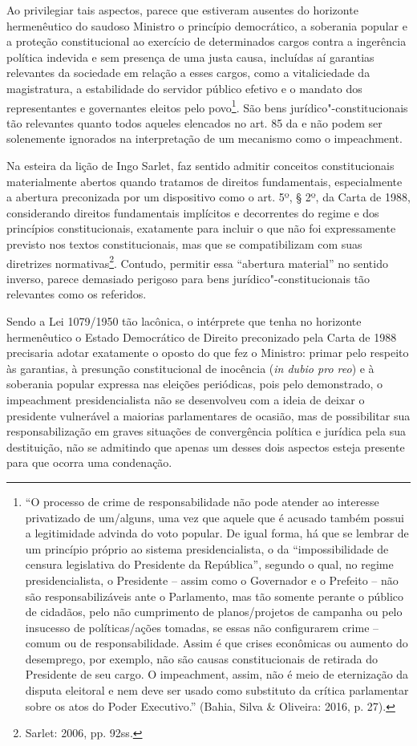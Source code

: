 Ao privilegiar tais aspectos, parece que estiveram ausentes do horizonte
hermenêutico do saudoso Ministro o princípio democrático, a soberania
popular e a proteção constitucional ao exercício de determinados cargos
contra a ingerência política indevida e sem presença de uma justa causa,
incluídas aí garantias relevantes da sociedade em relação a esses
cargos, como a vitaliciedade da magistratura, a estabilidade do servidor
público efetivo e o mandato dos representantes e governantes eleitos
pelo povo\footnote{``O processo de crime de responsabilidade não pode
  atender ao interesse privatizado de um/alguns, uma vez que aquele que
  é acusado também possui a legitimidade advinda do voto popular. De
  igual forma, há que se lembrar de um princípio próprio ao sistema
  presidencialista, o da ``impossibilidade de censura legislativa do
  Presidente da República'', segundo o qual, no regime presidencialista,
  o Presidente -- assim como o Governador e o Prefeito -- não são
  responsabilizáveis ante o Parlamento, mas tão somente perante o
  público de cidadãos, pelo não cumprimento de planos/projetos de
  campanha ou pelo insucesso de políticas/ações tomadas, se essas não
  configurarem crime -- comum ou de responsabilidade. Assim é que crises
  econômicas ou aumento do desemprego, por exemplo, não são causas
  constitucionais de retirada do Presidente de seu cargo. O
  impeachment, assim, não é meio de eternização da disputa
  eleitoral e nem deve ser usado como substituto da crítica parlamentar
  sobre os atos do Poder Executivo.'' (Bahia, Silva \& Oliveira: 2016,
  p. 27).}. São bens jurídico"-constitucionais tão relevantes quanto todos
aqueles elencados no art. 85 da  e não podem ser solenemente ignorados
na interpretação de um mecanismo como o impeachment.

Na esteira da lição de Ingo Sarlet, faz sentido admitir conceitos
constitucionais materialmente abertos quando tratamos de direitos
fundamentais, especialmente a abertura preconizada por um dispositivo
como o art. 5º, § 2º, da Carta de 1988, considerando direitos
fundamentais implícitos e decorrentes do regime e dos princípios
constitucionais, exatamente para incluir o que não foi expressamente
previsto nos textos constitucionais, mas que se compatibilizam com suas
diretrizes normativas\footnote{Sarlet: 2006, pp. 92ss.}. Contudo, permitir essa
``abertura material'' no sentido inverso, parece demasiado perigoso para
bens jurídico"-constitucionais tão relevantes como os referidos.

Sendo a Lei 1079/1950 tão lacônica, o intérprete que tenha no horizonte
hermenêutico o Estado Democrático de Direito preconizado pela Carta de
1988 precisaria adotar exatamente o oposto do que fez o Ministro: primar
pelo respeito às garantias, à presunção constitucional de inocência
(\emph{in dubio pro reo}) e à soberania popular expressa nas eleições
periódicas, pois pelo demonstrado, o impeachment presidencialista
não se desenvolveu com a ideia de deixar o presidente vulnerável a
maiorias parlamentares de ocasião, mas de possibilitar sua
responsabilização em graves situações de convergência política e
jurídica pela sua destituição, não se admitindo que apenas um desses
dois aspectos esteja presente para que ocorra uma condenação.


